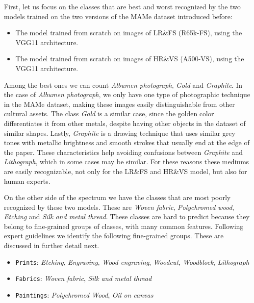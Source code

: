 \documentclass{article}
\begin{document}
First, let us focus on the classes that are best and worst recognized by the two models trained on the two versions of the MAMe dataset introduced before:

\begin{itemize}
    \item The model trained from scratch on images of LR\&FS (R65k-FS), using the VGG11 architecture.
    \item The model trained from scratch on images of HR\&VS (A500-VS), using the VGG11 architecture.
\end{itemize}


Among the best ones we can count \textit{Albumen photograph}, \textit{Gold} and \textit{Graphite}. In the case of \textit{Albumen photograph}, we only have one type of photographic technique in the MAMe dataset, making these images easily distinguishable from other cultural assets. The class \textit{Gold} is a similar case, since the golden color differentiates it from other metals, despite having other objects in the dataset of similar shapes. Lastly, \textit{Graphite} is a drawing technique that uses similar grey tones with metallic brightness and smooth strokes that usually end at the edge of the paper. These characteristics help avoiding confusions between \textit{Graphite} and \textit{Lithograph}, which in some cases may be similar. For these reasons these mediums are easily recognizable, not only for the LR\&FS and HR\&VS model, but also for human experts.

On the other side of the spectrum we have the classes that are most poorly recognized by these two models. These are \textit{Woven fabric}, \textit{Polychromed wood}, \textit{Etching} and \textit{Silk and metal thread}. These classes are hard to predict because they belong to fine-grained groups of classes, with many common features. Following expert guidelines we identify the following fine-grained groups. These are discussed in further detail next.

\begin{itemize}
    \item \texttt{Prints}: \textit{Etching}, \textit{Engraving}, \textit{Wood engraving}, \textit{Woodcut}, \textit{Woodblock}, \textit{Lithograph}
    \item \texttt{Fabrics}: \textit{Woven fabric}, \textit{Silk and metal thread}
    \item \texttt{Paintings}: \textit{Polychromed Wood}, \textit{Oil on canvas}
\end{itemize}
\end{document}
